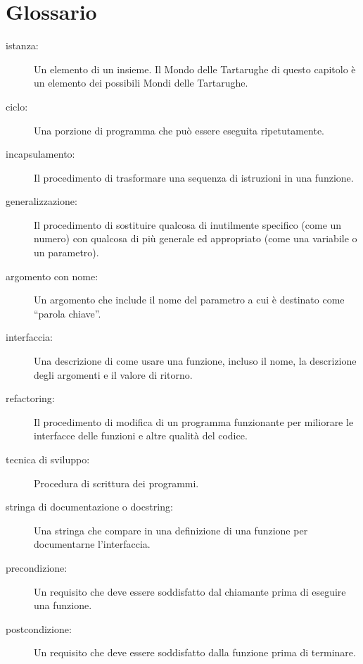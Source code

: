 \documentclass[10pt]{book}
\begin{document}
\section{Glossario}

\begin{description}

\item[istanza:] Un elemento di un insieme. Il Mondo delle Tartarughe di questo capitolo è un elemento dei possibili Mondi delle Tartarughe.

\item[ciclo:] Una porzione di programma che può essere eseguita ripetutamente.

\item[incapsulamento:] Il procedimento di trasformare una sequenza di istruzioni in una funzione.

\item[generalizzazione:] Il procedimento di sostituire qualcosa di inutilmente specifico (come un numero) con qualcosa di più generale ed appropriato (come una variabile o un parametro).

\item[argomento con nome:] Un argomento che include il nome del parametro a cui è destinato come ``parola chiave''.

\item[interfaccia:] Una descrizione di come usare una funzione, incluso il nome, la descrizione degli argomenti e il valore di ritorno.

\item[refactoring:] Il procedimento di modifica di un programma funzionante per miliorare le interfacce delle funzioni e altre qualità del codice.

\item[tecnica di sviluppo:] Procedura di scrittura dei programmi.

\item[stringa di documentazione o docstring:]  Una stringa che compare in una definizione di una funzione per documentarne l'interfaccia.

\item[precondizione:] Un requisito che deve essere soddisfatto dal chiamante prima di eseguire una funzione.

\item[postcondizione:] Un requisito che deve essere soddisfatto dalla funzione prima di terminare.

\end{description}
\end{document}

